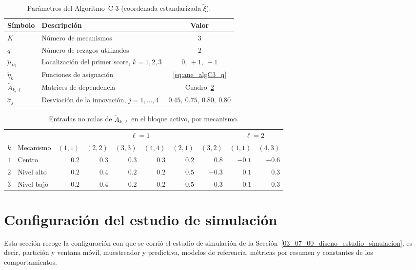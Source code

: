 \begin{table}[H]
\centering
\caption{Parámetros del Algoritmo~C-3 (coordenada estandarizada $\tilde{\xi}$).}
\label{tab:ane_algC3}
\begin{tabular}{llc}
\hline
Símbolo & Descripción & Valor \\
\hline
$K$                  & Número de mecanismos                                   & $3$ \\
$q$                  & Número de rezagos utilizados                           & $2$ \\
$\tilde\mu_{k1}$     & Localización del primer score, $k=1,2,3$               & $0,\ +1,\ -1$ \\
$\tilde{\eta}_k$         & Funciones de asignación                                & \eqref{eq:ane_algC3_q} \\
$\tilde A_{k,\ell}$  & Matrices de dependencia                                & Cuadro~\ref{tab:ane_algC3_mecanismos} \\
$\tilde\sigma_j$     & Desviación de la innovación, $j=1,\ldots,4$            & $0.45,\ 0.75,\ 0.80,\ 0.80$ \\
\hline
\end{tabular}
\end{table}

\begin{table}[H]
\centering
\caption{Entradas no nulas de $\tilde A_{k,\ell}$ en el bloque activo, por mecanismo.}
\label{tab:ane_algC3_mecanismos}
\small\setlength{\tabcolsep}{4pt}
\begin{tabular}{clrrrrrrrr}
\hline
 & & \multicolumn{6}{c}{$\ell=1$} & \multicolumn{2}{c}{$\ell=2$} \\
$k$ & Mecanismo & $(1,1)$ & $(2,2)$ & $(3,3)$ & $(4,4)$ & $(2,1)$ & $(3,2)$ & $(1,1)$ & $(4,3)$ \\
\hline
$1$ & Centro      & $0.2$ & $0.3$ & $0.3$ & $0.3$ & $0.2$  & $0.8$  & $-0.1$ & $-0.6$ \\
$2$ & Nivel alto  & $0.2$ & $0.4$ & $0.2$ & $0.2$ & $0.5$  & $-0.3$ & $0.1$  & $0.3$ \\
$3$ & Nivel bajo  & $0.2$ & $0.4$ & $0.2$ & $0.2$ & $-0.5$ & $-0.3$ & $0.1$  & $0.3$ \\
\hline
\end{tabular}
\end{table}

\section{Configuración del estudio de simulación}
\label{ane_00_03_configuracion}
Esta sección recoge la configuración con que se corrió el estudio de simulación de la Sección~\ref{03_07_00_diseno_estudio_simulacion}, es decir, partición y ventana móvil, muestreador y predictiva, modelos de referencia, métricas por resumen y constantes de los comportamientos.\\



